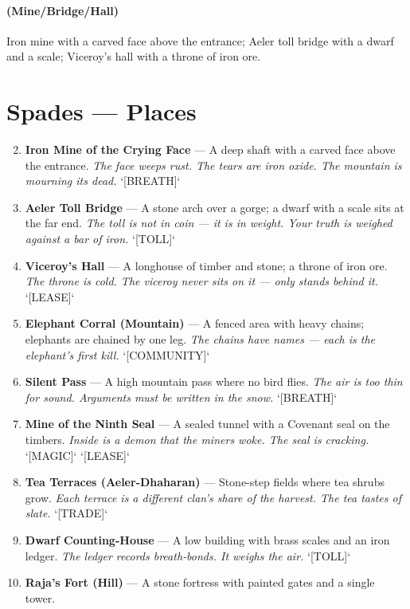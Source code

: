 \paragraph*{(Mine/Bridge/Hall)} Iron mine with a carved face above the entrance; Aeler toll bridge with a dwarf and a scale; Viceroy's hall with a throne of iron ore.

\section*{Spades --- Places}
\label{sec:satrapies-places}
\begin{enumerate}
\setcounter{enumi}{1}
\item \textbf{Iron Mine of the Crying Face} --- A deep shaft with a carved face above the entrance.
  \hfill \textit{The face weeps rust. The tears are iron oxide. The mountain is mourning its dead.} `[BREATH]`
\item \textbf{Aeler Toll Bridge} --- A stone arch over a gorge; a dwarf with a scale sits at the far end.
  \hfill \textit{The toll is not in coin — it is in weight. Your truth is weighed against a bar of iron.} `[TOLL]`
\item \textbf{Viceroy's Hall} --- A longhouse of timber and stone; a throne of iron ore.
  \hfill \textit{The throne is cold. The viceroy never sits on it — only stands behind it.} `[LEASE]`
\item \textbf{Elephant Corral (Mountain)} --- A fenced area with heavy chains; elephants are chained by one leg.
  \hfill \textit{The chains have names — each is the elephant's first kill.} `[COMMUNITY]`
\item \textbf{Silent Pass} --- A high mountain pass where no bird flies.
  \hfill \textit{The air is too thin for sound. Arguments must be written in the snow.} `[BREATH]`
\item \textbf{Mine of the Ninth Seal} --- A sealed tunnel with a Covenant seal on the timbers.
  \hfill \textit{Inside is a demon that the miners woke. The seal is cracking.} `[MAGIC]` `[LEASE]`
\item \textbf{Tea Terraces (Aeler-Dhaharan)} --- Stone-step fields where tea shrubs grow.
  \hfill \textit{Each terrace is a different clan's share of the harvest. The tea tastes of slate.} `[TRADE]`
\item \textbf{Dwarf Counting-House} --- A low building with brass scales and an iron ledger.
  \hfill \textit{The ledger records breath‑bonds. It weighs the air.} `[TOLL]`
\item \textbf{Raja's Fort (Hill)} --- A stone fortress with painted gates and a single tower.

\end{enumerate}
